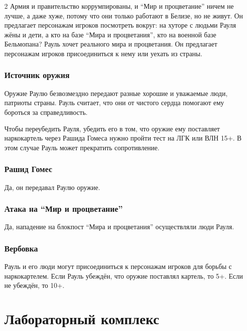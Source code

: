 \documentclass[twoside]{article}
\begin{document}
\begin{multicols}{2}
Армия и правительство коррумпированы, и \enquote{Мир и процветание} ничем не
лучше, а даже хуже, потому что они только работают в Белизе, но не
живут. Он предлагает персонажам игроков посмотреть вокруг: на хуторе с
людьми Рауля жёны и дети, а кто на базе \enquote{Мира и процветания}, кто на
военной базе Бельмопана? Рауль хочет реального мира и процветания. Он
предлагает персонажам игроков присоединиться к нему или уехать из
страны.

\subsubsection{Источник оружия}\label{weapons-source}

Оружие Раулю безвозмездно передают разные хорошие и уважаемые люди,
патриоты страны. Рауль считает, что они от чистого сердца помогают ему
бороться за справедливость.

Чтобы переубедить Рауля, убедить его в том, что оружие ему поставляет
наркокартель через Рашида Гомеса нужно пройти тест на ЛГК или ВЛН 15+. В
этом случае Рауль может прекратить сопротивление.

\subsubsection{Рашид Гомес}\label{rashid-gomez-mendoza}

Да, он передавал Раулю оружие.

\subsubsection{Атака на \enquote{Мир и процветание}}\label{pap-attack-mendoza}

Да, нападение на блокпост \enquote{Мира и процветания} осуществляли люди Рауля.

\subsubsection{Вербовка}\label{recruitment-mendoza}

Рауль и его люди могут присоединиться к персонажам игроков для борьбы с
наркокартелем. Если Рауль убеждён, что оружие поставлял картель, то 5+.
Если не убеждён, то 10+.

\section{Лабораторный комплекс}\label{laboratory-complex}


\end{multicols}
\end{document}
